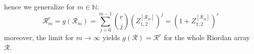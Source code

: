 hence we generalize for $m\in\mathbb{N}$:
\begin{displaymath}
\mathcal{R}_{m}^{r} = g{\left (\mathcal{R}_{m} \right )} = \sum_{j=0}^{m-1}{\binom{r}{j}}{\left(Z_{1,2}^{[\mathcal{R}_{m}]}\right)^{j} } = \left(1+Z_{1,2}^{[\mathcal{R}_{m}]}\right)^{r}
\end{displaymath}
moreover, the limit for $m \rightarrow \infty$ yields $ g{\left (\mathcal{R} \right )} = \mathcal{R}^{r} $ for the whole Riordan array $\mathcal{R}$.

